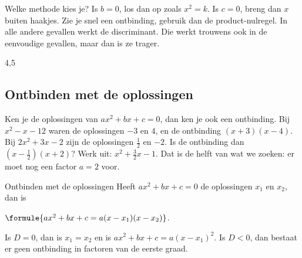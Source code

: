 Welke methode kies je? Is $b = 0$, los dan op zoals $x^2 = k$. Is $c = 0$, breng dan $x$ buiten haakjes. Zie je snel een ontbinding, gebruik dan de product-nulregel. In alle andere gevallen werkt de discriminant. Die werkt trouwens ook in de eenvoudige gevallen, maar dan is ze trager.

\begin{oefeningen}
\end{oefeningen}

\begin{alleenvoor}{4,5}
\subsection{Ontbinden met de oplossingen}

Ken je de oplossingen van $ax^2 + bx + c = 0$, dan ken je ook een ontbinding. Bij $x^2 - x - 12$ waren de oplossingen $-3$ en $4$, en de ontbinding $(x + 3)(x - 4)$. Bij $2x^2 + 3x - 2$ zijn de oplossingen $\tfrac12$ en $-2$. Is de ontbinding dan $(x - \tfrac12)(x + 2)$? Werk uit: $x^2 + \tfrac32 x - 1$. Dat is de helft van wat we zoeken: er moet nog een factor $a = 2$ voor.

\begin{theorie}
\begin{stelling}{Ontbinden met de oplossingen}
Heeft $ax^2 + bx + c = 0$ de oplossingen $x_1$ en $x_2$, dan is

\qquad $\formule{ax^2 + bx + c = a(x - x_1)(x - x_2)}$.

Is $D = 0$, dan is $x_1 = x_2$ en is $ax^2 + bx + c = a(x - x_1)^2$. Is $D < 0$, dan bestaat er geen ontbinding in factoren van de eerste graad.
\end{stelling}
\end{theorie}


\end{alleenvoor}
